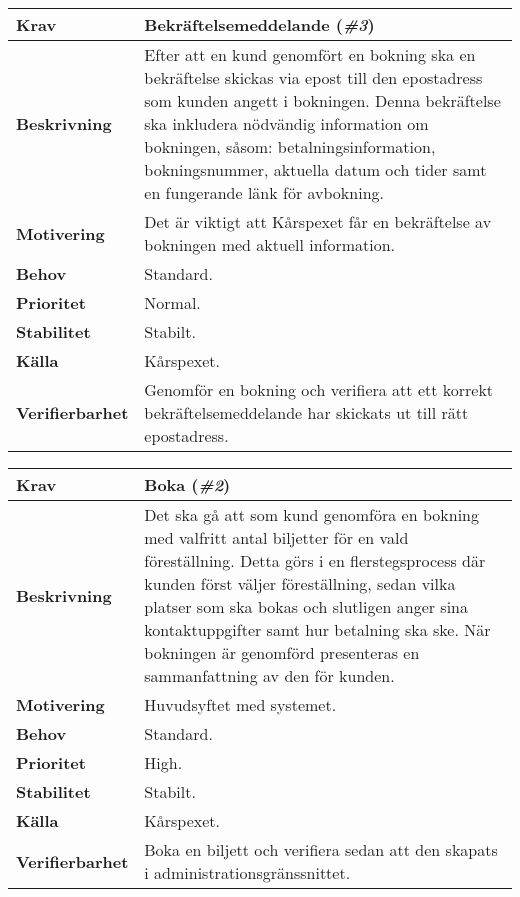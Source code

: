 \documentclass[a4paper, twoside, 11pt, titlepage]{article}
\begin{document}
		\begin{tabular} { p{2.6cm} p{12.5cm} }
			\hline
			\sffamily\textbf{Krav} & Bekräftelsemeddelande (\emph{\#3})  \\
			\hline
			\sffamily\textbf{Beskrivning} & Efter att en kund genomfört en bokning ska en bekräftelse skickas via epost till den epostadress som kunden angett i bokningen. Denna bekräftelse ska inkludera nödvändig information om bokningen, såsom: betalningsinformation, bokningsnummer, aktuella datum och tider samt en fungerande länk för avbokning.  \\
			\hline
			\sffamily\textbf{Motivering} & Det är viktigt att Kårspexet får en bekräftelse av bokningen med aktuell information.  \\
			\hline
			\sffamily\textbf{Behov} & Standard.  \\
			\hline
			\sffamily\textbf{Prioritet} & Normal.  \\
			\hline
			\sffamily\textbf{Stabilitet} & Stabilt.  \\
			\hline
			\sffamily\textbf{Källa} & Kårspexet.  \\
			\hline
			\sffamily\textbf{Verifierbarhet} & Genomför en bokning och verifiera att ett korrekt bekräftelsemeddelande har skickats ut till rätt epostadress.  \\
			\hline
		\end{tabular}
		\vspace{6mm}

		\begin{tabular} { p{2.6cm} p{12.5cm} }
			\hline
			\sffamily\textbf{Krav} & Boka (\emph{\#2})  \\
			\hline
			\sffamily\textbf{Beskrivning} & Det ska gå att som kund genomföra en bokning med valfritt antal biljetter för en vald föreställning. Detta görs i en flerstegsprocess där kunden först väljer föreställning, sedan vilka platser som ska bokas och slutligen anger sina kontaktuppgifter samt hur betalning ska ske. När bokningen är genomförd presenteras en sammanfattning av den för kunden.  \\
			\hline
			\sffamily\textbf{Motivering} & Huvudsyftet med systemet.  \\
			\hline
			\sffamily\textbf{Behov} & Standard.  \\
			\hline
			\sffamily\textbf{Prioritet} & High.  \\
			\hline
			\sffamily\textbf{Stabilitet} & Stabilt.  \\
			\hline
			\sffamily\textbf{Källa} & Kårspexet.  \\
			\hline
			\sffamily\textbf{Verifierbarhet} & Boka en biljett och verifiera sedan att den skapats i administrationsgränssnittet.  \\
			\hline
		\end{tabular}
		\vspace{6mm}
\end{document}
